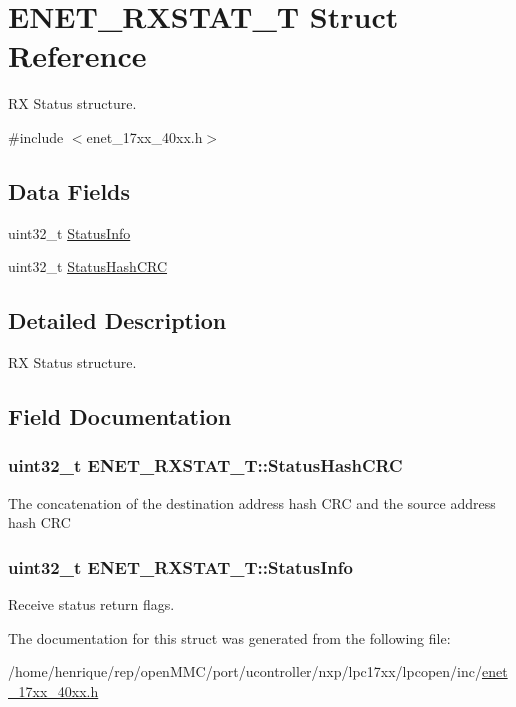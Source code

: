 \hypertarget{structENET__RXSTAT__T}{\section{E\-N\-E\-T\-\_\-\-R\-X\-S\-T\-A\-T\-\_\-\-T Struct Reference}
\label{structENET__RXSTAT__T}
}


R\-X Status structure.  




{\ttfamily \#include $<$enet\-\_\-17xx\-\_\-40xx.\-h$>$}

\subsection*{Data Fields}
\begin{DoxyCompactItemize}
\item 
uint32\-\_\-t \hyperlink{structENET__RXSTAT__T_a0d2de29791ff4358c5cc4dedd694857d}{Status\-Info}
\item 
uint32\-\_\-t \hyperlink{structENET__RXSTAT__T_a52d71f70dc193d59f6cb67241d92a4c9}{Status\-Hash\-C\-R\-C}
\end{DoxyCompactItemize}


\subsection{Detailed Description}
R\-X Status structure. 

\subsection{Field Documentation}
\hypertarget{structENET__RXSTAT__T_a52d71f70dc193d59f6cb67241d92a4c9}{
\subsubsection[{Status\-Hash\-C\-R\-C}]{\setlength{\rightskip}{0pt plus 5cm}uint32\-\_\-t E\-N\-E\-T\-\_\-\-R\-X\-S\-T\-A\-T\-\_\-\-T\-::\-Status\-Hash\-C\-R\-C}}\label{structENET__RXSTAT__T_a52d71f70dc193d59f6cb67241d92a4c9}
The concatenation of the destination address hash C\-R\-C and the source address hash C\-R\-C \hypertarget{structENET__RXSTAT__T_a0d2de29791ff4358c5cc4dedd694857d}{
\subsubsection[{Status\-Info}]{\setlength{\rightskip}{0pt plus 5cm}uint32\-\_\-t E\-N\-E\-T\-\_\-\-R\-X\-S\-T\-A\-T\-\_\-\-T\-::\-Status\-Info}}\label{structENET__RXSTAT__T_a0d2de29791ff4358c5cc4dedd694857d}
Receive status return flags. 

The documentation for this struct was generated from the following file\-:\begin{DoxyCompactItemize}
\item 
/home/henrique/rep/open\-M\-M\-C/port/ucontroller/nxp/lpc17xx/lpcopen/inc/\hyperlink{enet__17xx__40xx_8h}{enet\-\_\-17xx\-\_\-40xx.\-h}\end{DoxyCompactItemize}
